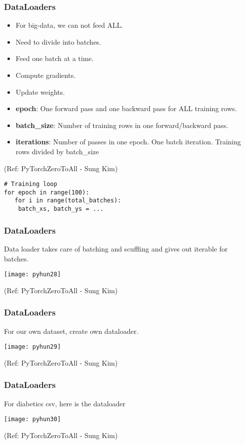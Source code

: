 \begin{frame}[fragile] \frametitle{DataLoaders}
\begin{itemize}
\item For big-data, we can not feed ALL. 
\item Need to divide into batches. 
\item Feed one batch at a time. 
\item Compute gradients.
\item Update weights.
\item \textbf{epoch}: One forward pass and one backward pass for ALL training rows.
\item \textbf{batch\_size}: Number of training rows in one forward/backward pass.
\item \textbf{iterations}: Number of passes in one epoch. One batch iteration. Training rows divided by batch\_size
\end{itemize}

\tiny{(Ref: PyTorchZeroToAll  - Sung Kim)}

\begin{lstlisting}
# Training loop
for epoch in range(100):
   for i in range(total_batches):
   	batch_xs, batch_ys = ...
\end{lstlisting}

\end{frame}

\begin{frame}[fragile] \frametitle{DataLoaders}
Data loader takes care of batching and scuffling and gives out iterable for batches.
\begin{center}
\texttt{[image: pyhun28]}
\end{center}

\tiny{(Ref: PyTorchZeroToAll  - Sung Kim)}
\end{frame}

\begin{frame}[fragile] \frametitle{DataLoaders}
For our own dataset, create own dataloader.
\begin{center}
\texttt{[image: pyhun29]}
\end{center}

\tiny{(Ref: PyTorchZeroToAll  - Sung Kim)}
\end{frame}

\begin{frame}[fragile] \frametitle{DataLoaders}
For diabetics csv, here is the dataloader
\begin{center}
\texttt{[image: pyhun30]}
\end{center}

\tiny{(Ref: PyTorchZeroToAll  - Sung Kim)}
\end{frame}


